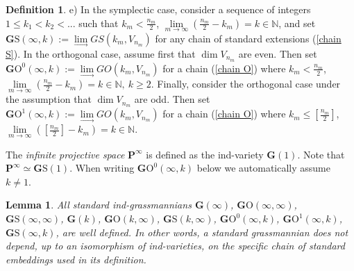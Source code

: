 \documentclass[12pt]{amsart}
\newtheorem{lemma}[theorem]{Lemma}
\theoremstyle{definition}
\newtheorem{definition}[theorem]{Definition}
\begin{document}
\begin{definition}
e) In the symplectic case, consider a sequence of integers $1\le k_1< k_2<...$ such that $k_m<\frac{n_m}{2}$,
$\underset{m\to\infty}\lim(\frac{n_m}{2}-k_m)=k\in\mathbb{N}$, and set
$\mathbf{G}\mathrm{S}(\infty,k):=\underset{\to}\lim GS(k_m,V_{n_m})$
for any chain of standard extensions (\ref{chain S}). In the orthogonal case, assume first that $\dim V_{n_m}$ are even.
Then set $\mathbf{G}\mathrm{O}^0(\infty,k):=\underset{\to}\lim GO(k_m,V_{n_m})$ for a chain (\ref{chain O}) where
$k_m<\frac{n_m}{2}$, $\underset{m\to\infty}\lim(\frac{n_m}{2}-k_m)=k\in\mathbb{N},\ k\ge2$. Finally, consider the
orthogonal case under the assumption that $\dim V_{n_m}$ are odd. Then set
$\mathbf{G}\mathrm{O}^1(\infty,k):=\underset{\to}\lim GO(k_m,V_{n_m})$ for a chain (\ref{chain O}) where
$k_m\leq [\frac{n_m}{2}]$, $\underset{m\to\infty}\lim([\frac{n_m}{2}]-k_m)=k\in\mathbb{N}$.
\end{definition}


The \textit{infinite projective space} $\mathbf{P}^\infty$ is defined as the ind-variety $\mathbf{G}(1)$.
Note that $\mathbf{P}^\infty\simeq\mathbf{G}\mathrm{S}(1)$. When writing $\mathbf{G}\mathrm{O}^0(\infty,k)$ below
we automatically assume $k\ne1$.


\begin{lemma}\label{G infty}
All standard ind-grassmannians $\mathbf{G}(\infty)$, $\mathbf{G}\mathrm{O}(\infty,\infty)$,
$\mathbf{G}\mathrm{S}(\infty,\infty)$, $\mathbf{G}(k)$, $\mathbf{G}\mathrm{O}(k,\infty)$,
$\mathbf{G}\mathrm{S}(k,\infty)$, $\mathbf{G}\mathrm{O}^0(\infty,k)$, $\mathbf{G}\mathrm{O}^1(\infty,k)$,
$\mathbf{G}\mathrm{S}(\infty,k)$,
are well defined. In other words, a standard grassmannian does not depend,
up to an isomorphism of ind-varieties, on the specific chain of standard embeddings used in its definition.
\end{lemma}
\end{document}
